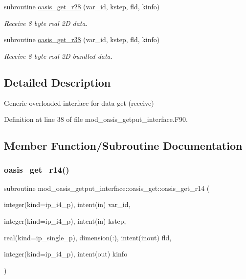 \begin{DoxyCompactItemize}
subroutine \hyperlink{interfacemod__oasis__getput__interface_1_1oasis__get_a4a267e854a4e856f082bc8a3c51385ee}{oasis\+\_\+get\+\_\+r28} (var\+\_\+id, kstep, fld, kinfo)
\begin{DoxyCompactList}\small\item\em Receive 8 byte real 2D data. \end{DoxyCompactList}\item 
subroutine \hyperlink{interfacemod__oasis__getput__interface_1_1oasis__get_a3f693dda147531af4b25f255e4363890}{oasis\+\_\+get\+\_\+r38} (var\+\_\+id, kstep, fld, kinfo)
\begin{DoxyCompactList}\small\item\em Receive 8 byte real 2D bundled data. \end{DoxyCompactList}\end{DoxyCompactItemize}


\subsection{Detailed Description}
Generic overloaded interface for data get (receive) 

Definition at line 38 of file mod\+\_\+oasis\+\_\+getput\+\_\+interface.\+F90.



\subsection{Member Function/\+Subroutine Documentation}
\mbox{\label{interfacemod__oasis__getput__interface_1_1oasis__get_af8755eb7d3a5f52268752317dd955547}} 
\subsubsection{\texorpdfstring{oasis\+\_\+get\+\_\+r14()}{oasis\_get\_r14()}}
{\footnotesize\ttfamily subroutine mod\+\_\+oasis\+\_\+getput\+\_\+interface\+::oasis\+\_\+get\+::oasis\+\_\+get\+\_\+r14 (\begin{DoxyParamCaption}\item[{integer(kind=ip\+\_\+i4\+\_\+p), intent(in)}]{var\+\_\+id,  }\item[{integer(kind=ip\+\_\+i4\+\_\+p), intent(in)}]{kstep,  }\item[{real(kind=ip\+\_\+single\+\_\+p), dimension(\+:), intent(inout)}]{fld,  }\item[{integer(kind=ip\+\_\+i4\+\_\+p), intent(out)}]{kinfo }\end{DoxyParamCaption})\hspace{0.3cm}{\ttfamily [private]}}



